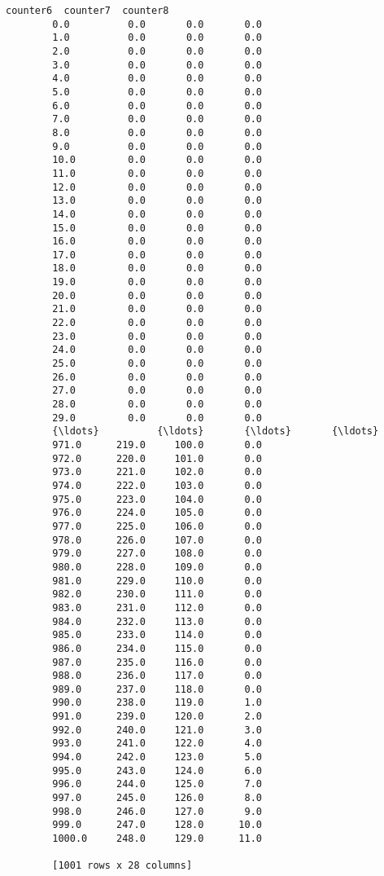\documentclass[11pt]{article}
\begin{document}
\begin{Verbatim}[commandchars=\\\{\}]
                counter6  counter7  counter8  
        0.0          0.0       0.0       0.0  
        1.0          0.0       0.0       0.0  
        2.0          0.0       0.0       0.0  
        3.0          0.0       0.0       0.0  
        4.0          0.0       0.0       0.0  
        5.0          0.0       0.0       0.0  
        6.0          0.0       0.0       0.0  
        7.0          0.0       0.0       0.0  
        8.0          0.0       0.0       0.0  
        9.0          0.0       0.0       0.0  
        10.0         0.0       0.0       0.0  
        11.0         0.0       0.0       0.0  
        12.0         0.0       0.0       0.0  
        13.0         0.0       0.0       0.0  
        14.0         0.0       0.0       0.0  
        15.0         0.0       0.0       0.0  
        16.0         0.0       0.0       0.0  
        17.0         0.0       0.0       0.0  
        18.0         0.0       0.0       0.0  
        19.0         0.0       0.0       0.0  
        20.0         0.0       0.0       0.0  
        21.0         0.0       0.0       0.0  
        22.0         0.0       0.0       0.0  
        23.0         0.0       0.0       0.0  
        24.0         0.0       0.0       0.0  
        25.0         0.0       0.0       0.0  
        26.0         0.0       0.0       0.0  
        27.0         0.0       0.0       0.0  
        28.0         0.0       0.0       0.0  
        29.0         0.0       0.0       0.0  
        {\ldots}          {\ldots}       {\ldots}       {\ldots}  
        971.0      219.0     100.0       0.0  
        972.0      220.0     101.0       0.0  
        973.0      221.0     102.0       0.0  
        974.0      222.0     103.0       0.0  
        975.0      223.0     104.0       0.0  
        976.0      224.0     105.0       0.0  
        977.0      225.0     106.0       0.0  
        978.0      226.0     107.0       0.0  
        979.0      227.0     108.0       0.0  
        980.0      228.0     109.0       0.0  
        981.0      229.0     110.0       0.0  
        982.0      230.0     111.0       0.0  
        983.0      231.0     112.0       0.0  
        984.0      232.0     113.0       0.0  
        985.0      233.0     114.0       0.0  
        986.0      234.0     115.0       0.0  
        987.0      235.0     116.0       0.0  
        988.0      236.0     117.0       0.0  
        989.0      237.0     118.0       0.0  
        990.0      238.0     119.0       1.0  
        991.0      239.0     120.0       2.0  
        992.0      240.0     121.0       3.0  
        993.0      241.0     122.0       4.0  
        994.0      242.0     123.0       5.0  
        995.0      243.0     124.0       6.0  
        996.0      244.0     125.0       7.0  
        997.0      245.0     126.0       8.0  
        998.0      246.0     127.0       9.0  
        999.0      247.0     128.0      10.0  
        1000.0     248.0     129.0      11.0  
        
        [1001 rows x 28 columns]
\end{Verbatim}
            
\end{document}
